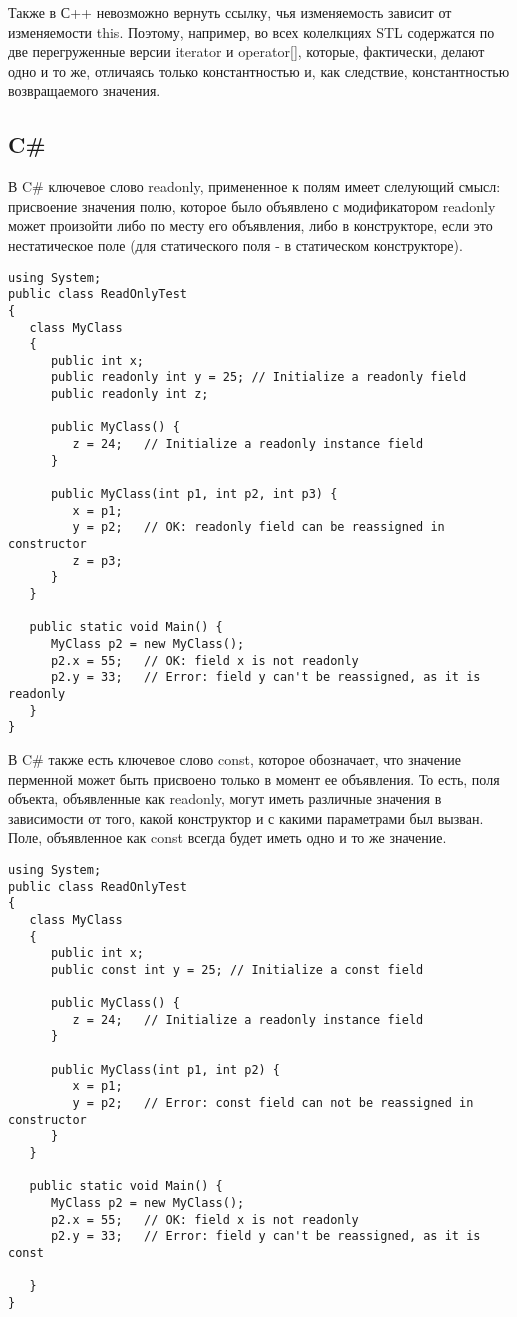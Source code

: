 Также в С++ невозможно вернуть ссылку, чья изменяемость зависит от изменяемости this. Поэтому, например, во всех колелкциях STL содержатся по две перегруженные версии iterator и operator[], которые, фактически, делают одно и то же, отличаясь только константностью и, как следствие, константностью возвращаемого значения.

\subsection{C\#}

В C\# ключевое слово readonly, примененное к полям имеет слелующий смысл: присвоение значения полю, которое было объявлено с модификатором readonly может произойти либо по месту его объявления, либо в конструкторе, если это нестатическое поле (для статического поля - в статическом конструкторе). 

\begin{lstlisting}[caption=Ключевое слово readonly в C\#, label=code:csharp_readonly]
using System;
public class ReadOnlyTest 
{
   class MyClass 
   {
      public int x;
      public readonly int y = 25; // Initialize a readonly field
      public readonly int z;

      public MyClass() {
         z = 24;   // Initialize a readonly instance field
      }

      public MyClass(int p1, int p2, int p3) {
         x = p1; 
         y = p2;   // OK: readonly field can be reassigned in constructor
         z = p3;
      }
   }

   public static void Main() {        
      MyClass p2 = new MyClass();
      p2.x = 55;   // OK: field x is not readonly
      p2.y = 33;   // Error: field y can't be reassigned, as it is readonly      
   }
}	
\end{lstlisting}

В C\# также есть ключевое слово const, которое обозначает, что значение перменной может быть присвоено только в момент ее объявления. То есть, поля объекта, объявленные как readonly, могут иметь различные значения в зависимости от того, какой конструктор и с какими параметрами был вызван. Поле, объявленное как const всегда будет иметь одно и то же значение.

\begin{lstlisting}[caption=Ключевое слово const в C\#, label=code:csharp_const]
using System;
public class ReadOnlyTest 
{
   class MyClass 
   {
      public int x;
      public const int y = 25; // Initialize a const field

      public MyClass() {
         z = 24;   // Initialize a readonly instance field
      }

      public MyClass(int p1, int p2) {
         x = p1; 
         y = p2;   // Error: const field can not be reassigned in constructor        
      }
   }

   public static void Main() {        
      MyClass p2 = new MyClass();
      p2.x = 55;   // OK: field x is not readonly
      p2.y = 33;   // Error: field y can't be reassigned, as it is const
      
   }
}	
\end{lstlisting}


